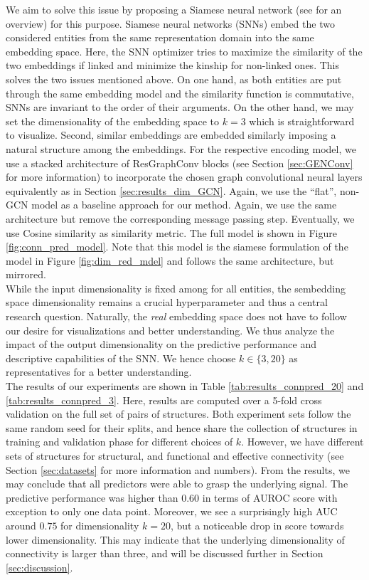 \documentclass[]{article}
\renewcommand{\cite}{\citep}
\begin{document}
We aim to solve this issue by proposing a Siamese neural network\cite{bromley1993signature} (see \citet{chicco2021siamese} for an overview) for this purpose. Siamese neural networks (SNNs) embed the two considered entities from the same representation domain into the same embedding space. Here, the SNN optimizer tries to maximize the similarity of the two embeddings if linked and minimize the kinship for non-linked ones. This solves the two issues mentioned above. On one hand, as both entities are put through the same embedding model and the similarity function is commutative, SNNs are invariant to the order of their arguments. On the other hand, we may set the dimensionality of the embedding space to $k=3$ which is straightforward to visualize. Second, similar embeddings are embedded similarly imposing a natural structure among the embeddings. 
For the respective encoding model, we use a stacked architecture of ResGraphConv blocks (see Section \ref{sec:GENConv} for more information) to incorporate the chosen graph convolutional neural layers equivalently as in Section \ref{sec:results_dim_GCN}. Again, we use the ``flat'', non-GCN model as a baseline approach for our method. Again, we use the same architecture but remove the corresponding message passing step. Eventually, we use Cosine similarity as similarity metric.
The full model is shown in Figure \ref{fig:conn_pred_model}. Note that this model is the siamese formulation of the model in Figure \ref{fig:dim_red_mdel} and follows the same architecture, but mirrored.\\

While the input dimensionality is fixed among for all entities, the sembedding space dimensionality remains a crucial hyperparameter and thus a central research question. Naturally, the \textit{real} embedding space does not have to follow our desire for visualizations and better understanding. We thus analyze the impact of the output dimensionality on the predictive performance and descriptive capabilities of the SNN. We hence choose $k\in \{3,20\}$ as representatives for a better understanding.\\

The results of our experiments are shown in Table \ref{tab:results_connpred_20} and \ref{tab:results_connpred_3}. Here, results are computed over a 5-fold cross validation on the full set of pairs of structures. Both experiment sets follow the same random seed for their splits, and hence share the collection of structures in training and validation phase for different choices of $k$. However, we have different sets of structures for structural, and functional and effective connectivity (see Section \ref{sec:datasets} for more information and numbers). 
From the results, we may conclude that all predictors were able to grasp the underlying signal. The predictive performance was higher than $0.60$ in terms of AUROC score with exception to only one data point. Moreover, we see a surprisingly high AUC  around $0.75$ for dimensionality $k=20$, but a noticeable drop in score towards lower dimensionality. This may indicate that the underlying dimensionality of connectivity is larger than three, and will be discussed further in Section \ref{sec:discussion}.
\end{document}
